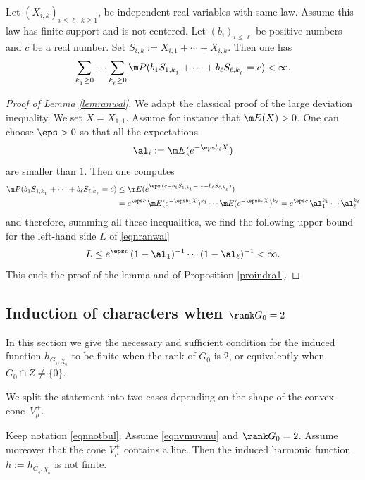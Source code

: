 \begin{Lem}
\label{lemranwal}
Let $(X_{i,k})_{i\leq \ell,\, k\geq 1}$, be independent real variables
with same law. Assume this law has finite support and is not centered.
Let $(b_i)_{i\leq\ell}$ be positive numbers and $c$ be a real number.
Set $S_{i,k}:=X_{i,1}+\cdots+X_{i,k}$.
Then one has
\begin{equation}
\label{eqnranwal}
\sum_{k_{_1}\geq 0}\cdots\sum_{k_{_\ell}\geq 0}
\m P(b_1S_{1,k_{_1}}+\cdots +b_\ell S_{\ell,k_{_\ell}}=c)
<\infty.
\end{equation}
\end{Lem}

\begin{proof}[Proof of Lemma \ref{lemranwal}]
We adapt the classical proof of the large deviation inequality.
We set $X=X_{1,1}$. Assume for instance that $\m E (X)>0$.
One can choose $\eps>0$ so that all the expectations
\[
\al_i:=\m E(e^{-\eps b_i X})
\]
are smaller than $1$. Then one computes
\begin{align*}
\m P(b_1S_{1,k_{_1}}+\cdots +b_\ell S_{\ell,k_{_\ell}}=c)
&\leq
\m E(e^{\eps\,(c -b_1S_{1,k_{_1}}-\cdots -b_\ell S_{\ell,k_{_\ell}})})\\
&=
e^{\eps c}\,\m E(e^{-\eps b_1X})^{k_1}\cdots \m E(e^{-\eps b_\ell X})^{k_\ell}=
e^{\eps c}\,\al_1^{k_1}\cdots \al_\ell^{k_\ell}
\end{align*}
and therefore, summing all these inequalities, we find the following upper bound
for the left-hand side $L$ of \eqref{eqnranwal}
\[
L\leq e^{\eps c}\,(1-\al_1)^{-1}\cdots (1-\al_\ell)^{-1} <\infty.
\]
This ends the proof of the lemma and of Proposition \ref{proindra1}.
\end{proof}

\subsection{Induction of characters when $\rank G_0=2$}
\label{secindhar2}
\bq
In this section we give the necessary and sufficient condition for
the induced function $h_{G_{_0},\chi_{_0}}$ to be finite when
the rank of $G_0$ is $2$,
or equivalently when $G_0\cap Z\neq\{0\}$.
\eq

We split the statement into two cases depending
on the shape of the convex cone~$V^+_\mu$.

\begin{Prop}
\label{proindra2}
Keep notation \eqref{eqnnotbul}. Assume \eqref{eqnvmuvmu} and $\rank G_0=2$.
Assume moreover that the cone $V^+_\mu$ contains a line. Then
the induced harmonic function $h:=h_{G_{_0},\chi_{_0}}$ is not finite.
\end{Prop}

